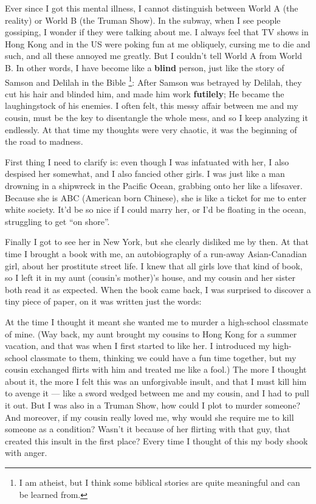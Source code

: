 \documentclass[12pt]{report}
\newcommand{\tab}{\hspace*{1cm}}
\newcommand{\speechEn}[1]{\textrm{\textit{\ #1\ }}}
\begin{document}
{
Ever since I got this mental illness, I cannot distinguish between World A (the reality) or World B (the Truman Show).  In the subway, when I see people gossiping, I wonder if they were talking about me.  I always feel that TV shows in Hong Kong and in the US were poking fun at me obliquely, cursing me to die and such, and all these annoyed me greatly.  But I couldn't tell World A from World B.  In other words, I have become like a \textbf{blind} person, just like the story of Samson and Delilah in the Bible \footnote{I am atheist, but I think some biblical stories are quite meaningful and can be learned from.}:  After Samson was betrayed by Delilah, they cut his hair and blinded him, and made him work \textbf{futilely};  He became the laughingstock of his enemies.  I often felt, this messy affair between me and my cousin, must be the key to disentangle the whole mess, and so I keep analyzing it endlessly.  At that time my thoughts were very chaotic, it was the beginning of the road to madness. 

First thing I need to clarify is: even though I was infatuated with her, I also despised her somewhat, and I also fancied other girls.  I was just like a man drowning in a shipwreck in the Pacific Ocean, grabbing onto her like a lifesaver.  Because she is ABC (American born Chinese), she is like a ticket for me to enter white society.  It'd be so nice if I could marry her, or I'd be floating in the ocean, struggling to get ``on shore''.

Finally I got to see her in New York, but she clearly disliked me by then.  At that time I brought a book with me, an autobiography of a run-away Asian-Canadian girl, about her prostitute street life.  I knew that all girls love that kind of book, so I left it in my aunt (cousin's mother)'s house, and my cousin and her sister both read it as expected.  When the book came back, I was surprised to discover a tiny piece of paper, on it was written just the words:

\setlength{\fboxsep}{10pt}
\tab \fbox{\speechEn{no escape except through death}}

At the time I thought it meant she wanted me to murder a high-school classmate of mine.  (Way back, my aunt brought my cousins to Hong Kong for a summer vacation, and that was when I first started to like her.  I introduced my high-school classmate to them, thinking we could have a fun time together, but my cousin exchanged flirts with him and treated me like a fool.)  The more I thought about it, the more I felt this was an unforgivable insult, and that I must kill him to avenge it --- like a sword wedged between me and my cousin, and I had to pull it out.  But I was also in a Truman Show, how could I plot to murder someone?  And moreover, if my cousin really loved me, why would she require me to kill someone as a condition?  Wasn't it because of her flirting with that guy, that created this insult in the first place?  Every time I thought of this my body shook with anger.

}
\end{document}
